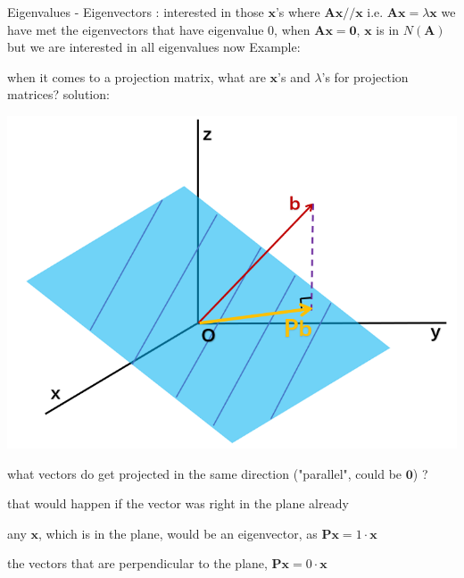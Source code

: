 \documentclass[12pt, a4paper]{article}
\begin{document}
{\noindent Eigenvalues - Eigenvectors : interested in those ${\mathbf{x}}$'s where ${\mathbf{A}}{\mathbf{x}} // {\mathbf{x}}$ \quad i.e. \quad ${\mathbf{A}}{\mathbf{x}} = \lambda{\mathbf{x}}$
\vspace{14pt}
\newline
we have met the eigenvectors that have eigenvalue 0, when ${\mathbf{A}}{\mathbf{x}} = {\mathbf{0}}$, ${\mathbf{x}}$ is in $N({\mathbf{A}})$
\newline
but we are interested in all eigenvalues now
\vspace{14pt}
\newline
Example:
\par 
when it comes to a projection matrix, what are ${\mathbf{x}}$'s and $\lambda$'s for projection matrices?
\newline
solution:
\begin{center}
	\includegraphics[scale=0.5]{figures/S21-1.png}
\end{center}
\par
what vectors do get projected in the same direction ("parallel", could be ${\mathbf{0}}$) ?
\par {} that would happen if the vector was right in the plane already
\par any ${\mathbf{x}}$, which is in the plane, would be an eigenvector, as ${\mathbf{P}}{\mathbf{x}} = 1 \cdot {\mathbf{x}}$
\par {} the vectors that are perpendicular to the plane, ${\mathbf{P}}{\mathbf{x}} = 0 \cdot {\mathbf{x}}$
\vspace{14pt}
\newline
}
\end{document}
